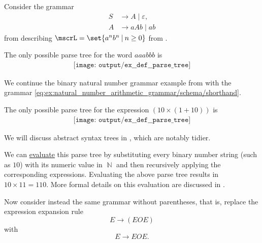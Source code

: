 \begin{example}
\begin{thmenum}
     Consider the grammar
    \begin{equation*}
      \begin{aligned}
        S &\to A \mid \varepsilon, \\
        A &\to aAb \mid ab
      \end{aligned}
    \end{equation*}
    from  describing \( \mscrL = \set{ a^n b^n \given n \geq 0 } \) from .

    The only possible parse tree for the word \( aaabbb \) is
    \begin{equation*}
      \begin{aligned}
        \texttt{[image: output/ex\_\_def\_\_parse\_tree]}
      \end{aligned}
    \end{equation*}

     We continue the binary natural number grammar example from  with the grammar \eqref{eq:ex:natural_number_arithmetic_grammar/schema/shorthand}.

    The only possible parse tree for the expression \( (10 \times (1 + 10)) \) is
    \begin{equation*}
      \begin{aligned}
        \texttt{[image: output/ex\_\_def\_\_parse\_tree]}
      \end{aligned}
    \end{equation*}

    We will discuss abstract syntax trees in , which are notably tidier.

    We can \hyperref[rem:evaluation]{evaluate} this parse tree by substituting every binary number string (such as \( 10 \)) with its numeric value in \( \BbbN \) and then recursively applying the corresponding expressions. Evaluating the above parse tree results in \( 10 \times 11 = 110 \). More formal details on this evaluation are discussed in .

    Now consider instead the same grammar without parentheses, that is, replace the expression expansion rule
    \begin{equation*}
      E \to (E O E)
    \end{equation*}
    with
    \begin{equation*}
      E \to E O E.
    \end{equation*}


\end{thmenum}
\end{example}

